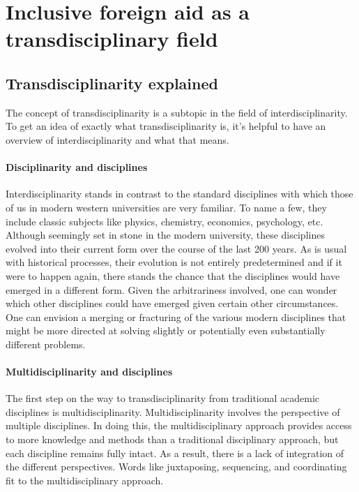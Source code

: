 \documentclass[a4paper]{article}
\begin{document}
\newpage
\section{Inclusive foreign aid as a transdisciplinary field}

\subsection{Transdisciplinarity explained}

The concept of transdisciplinarity is a subtopic in the field of
interdisciplinarity. To get an idea of exactly what transdisciplinarity is,
it’s helpful to have an overview of interdisciplinarity and what that means.

\paragraph{Disciplinarity and disciplines}

Interdisciplinarity stands in contrast to the standard disciplines with which
those of us in modern western universities are very familiar. To name a few,
they include classic subjects like physics, chemistry, economics, psychology,
etc. Although seemingly set in stone in the modern university, these
disciplines evolved into their current form over the course of the last 200
years. As is usual with historical processes, their evolution is not entirely
predetermined and if it were to happen again, there stands the chance that the
disciplines would have emerged in a different form. Given the arbitrariness
involved, one can wonder which other disciplines could have emerged given
certain other circumstances. One can envision a merging or fracturing of the
various modern disciplines that might be more directed at solving slightly or
potentially even substantially different problems. 

\paragraph{Multidisciplinarity and disciplines}

The first step on the way to transdisciplinarity from traditional academic
disciplines is multidisciplinarity. Multidisciplinarity involves the
perspective of multiple disciplines. In doing this, the multidisciplinary
approach provides access to more knowledge and methods than a traditional
disciplinary approach, but each discipline remains fully intact. As a result,
there is a lack of integration of the different perspectives. Words like
juxtaposing, sequencing, and coordinating fit to the multidisciplinary
approach. 
\end{document}
